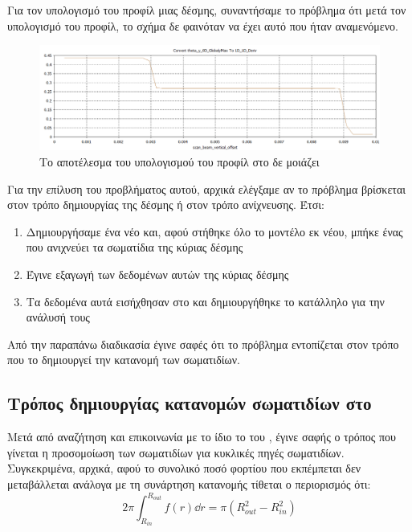 Για τον υπολογισμό του προφίλ μιας  δέσμης, συναντήσαμε το πρόβλημα ότι μετά τον υπολογισμό του προφίλ, το σχήμα δε φαινόταν να έχει αυτό που ήταν αναμενόμενο.

\begin{figure}[tph]
\includegraphics[width=\textwidth]{figures/CST-profile-steps}
\centering
\caption{Το αποτέλεσμα του υπολογισμού του προφίλ στο  δε μοιάζει }
\label{fig:CST-profile-steps}
\end{figure}

Για την επίλυση του προβλήματος αυτού, αρχικά ελέγξαμε αν το πρόβλημα βρίσκεται στον τρόπο δημιουργίας της δέσμης ή στον τρόπο ανίχνευσης. 
Έτσι:
\begin{enumerate}
\item Δημιουργήσαμε ένα νέο  και, αφού στήθηκε όλο το μοντέλο εκ νέου, μπήκε ένας  που ανιχνεύει τα σωματίδια της κύριας δέσμης
\item Έγινε εξαγωγή των δεδομένων αυτών της κύριας δέσμης
\item Τα δεδομένα αυτά εισήχθησαν στο  και δημιουργήθηκε το κατάλληλο  για την ανάλυσή τους
\end{enumerate}

Από την παραπάνω διαδικασία έγινε σαφές ότι το πρόβλημα εντοπίζεται στον τρόπο που το  δημιουργεί την κατανομή των σωματιδίων.

\subsection{Τρόπος δημιουργίας  κατανομών σωματιδίων στο }

Μετά από αναζήτηση και επικοινωνία με το ίδιο το  του , έγινε σαφής ο τρόπος που γίνεται η προσομοίωση των σωματιδίων για  κυκλικές πηγές σωματιδίων.
Συγκεκριμένα, αρχικά, αφού το συνολικό ποσό φορτίου που εκπέμπεται δεν μεταβάλλεται ανάλογα με τη συνάρτηση κατανομής τίθεται ο περιορισμός ότι:
\begin{equation}\label{eq:CST-gaussian-restriction}
2\pi \int_{R_{in}}^{R_{out}} f(r) \dd r = \pi \left(R_{out}^2 - R_{in}^2 \right) 
\end{equation}

